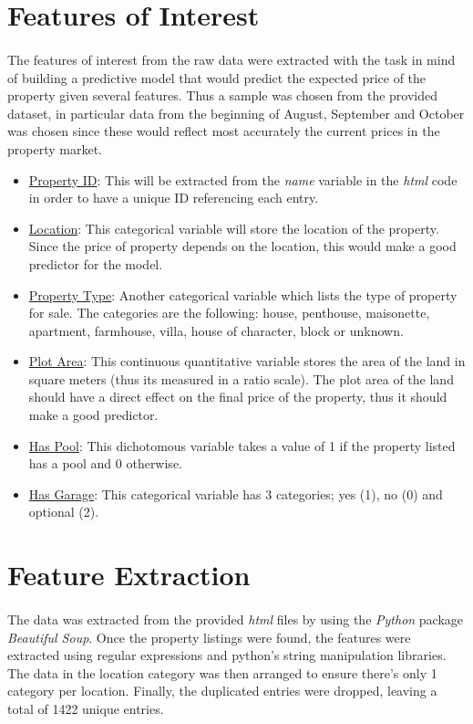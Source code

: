 \section{Features of Interest}
\paragraph{ }The features of interest from the raw data were extracted with the task in mind of building a predictive model that would predict the expected price of the property given several features. Thus a sample was chosen from the provided dataset, in particular data from the beginning of August, September and October was chosen since these would reflect most accurately the current prices in the property market. 
\begin{itemize}
	\item \underline{Property ID}: This will be extracted from the \textit{name} variable in the \textit{html} code in order to have a unique ID referencing each entry.
	\item \underline{Location}: This categorical variable will store the location of the property. Since the price of property depends on the location, this would make a good predictor for the model.
	\item \underline{Property Type}: Another categorical variable which lists the type of property for sale. The categories are the following: house, penthouse, maisonette, apartment, farmhouse, villa, house of character, block or unknown.
	\item \underline{Plot Area}: This continuous quantitative variable stores the area of the land in square meters (thus its measured in a ratio scale). The plot area of the land should have a direct effect on the final price of the property, thus it should make a good predictor.
	\item \underline{Has Pool}: This dichotomous variable takes a value of 1 if the property listed has a pool and 0 otherwise.
	\item \underline{Has Garage}: This categorical variable has 3 categories; yes (1), no (0) and optional (2).
\end{itemize}

\section{Feature Extraction}
\paragraph{ }The data was extracted from the provided \textit{html} files by using the \textit{Python} package \textit{Beautiful Soup}. Once the property listings were found, the features were extracted using regular expressions and python's string manipulation libraries. The data in the location category was then arranged to ensure there's only 1 category per location. Finally, the duplicated entries were dropped, leaving a total of 1422 unique entries.

